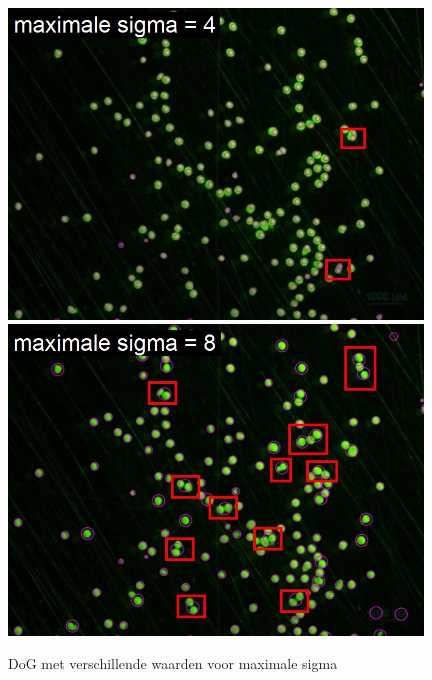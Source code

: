 \documentclass{article}
\begin{document}
\begin{multicols}{2}
\begin{figure}[H]
\centering
\includegraphics[width=0.98\textwidth]{images/small_sig.jpg}
\includegraphics[width=0.98\textwidth]{images/big_sig.jpg}
\caption{\label{fig:max_sigma_bepalen}DoG met verschillende waarden voor maximale sigma}
\end{figure}


\end{multicols}
\end{document}
